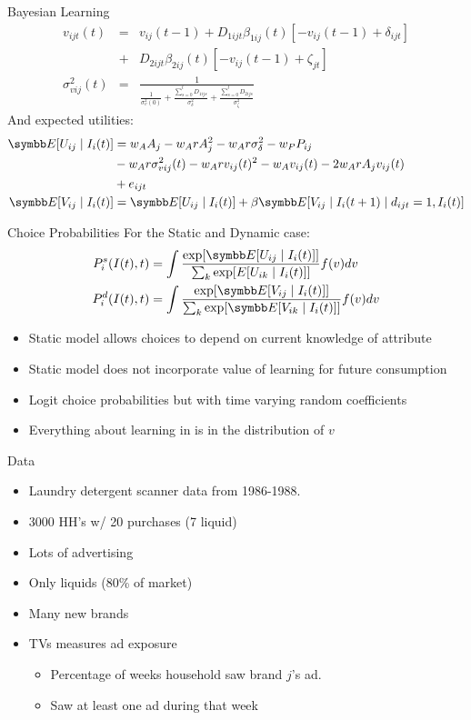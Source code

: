 \documentclass[aspectratio=169,11pt]{beamer}
\begin{document}
\begin{frame}{Bayesian Learning}
\begin{eqnarray*}
v_{ijt}(t) &=& v_{ij}(t-1) + D_{1ijt} \beta_{1ij}(t)[-v_{ij}(t-1) + \delta_{ijt}]  \\
&+& D_{2ijt} \beta_{2ij}(t)[-v_{ij}(t-1) + \zeta_{jt}]\\
\sigma_{vij}^2(t) &=& \frac{1}{\frac{1}{\sigma_v^2(0)} + \frac{\sum_{s=0}^t D_{1ijs}}{\sigma_{\delta}^2} + \frac{\sum_{s=0}^t D_{2ijs}}{\sigma_{\zeta}^2}}
\end{eqnarray*}
And expected utilities:
\begin{align*}
\E[U_{ij} \mid I_i(t)] &= w_A A_j - w_A r A_j^2 -w_A r \sigma_{\delta}^2 -w_P P_{ij} \\
& -w_A r \sigma_{vij}^2(t) - w_A r v_{ij}(t)^2  - w_A v_{ij}(t) - 2w_A r A_j v_{ij} (t) \\ &+ e_{ijt}\\
\E[V_{ij} \mid I_i(t)] &= \E[U_{ij} \mid I_i(t)] + \beta \E[V_{ij} \mid I_i(t+1) \mid d_{ijt} =1, I_i(t)]
\end{align*}
\end{frame}


\begin{frame}{Choice Probabilities}
For the Static and Dynamic case:
\begin{align*}
P^s_i(I(t),t) &= \int \frac{\exp [\E [U_{ij} \mid I_i(t)] ] } {\sum_k \exp [E [U_{ik} \mid I_i(t)] ] } f(v) dv\\
P^d_i(I(t),t) &= \int \frac{\exp [\E [V_{ij} \mid I_i(t)] ] } {\sum_k \exp [\E [V_{ik} \mid I_i(t)] ] } f(v) dv
\end{align*}
\begin{itemize}
\item Static model allows choices to depend on 
\alert{current knowledge of attribute}
\item Static model does not incorporate \alert{value of learning for future consumption}
\item Logit choice probabilities but with time varying random coefficients
\item Everything about learning in is in the distribution of $v$
\end{itemize}
\end{frame}


\begin{frame}{Data}
\begin{itemize}
\item Laundry detergent scanner data from 1986-1988.
\item 3000 HH's w/ 20 purchases (7 liquid)
\item Lots of advertising
\item Only liquids (80\% of market)
\item Many new brands
\item  TVs measures ad exposure
\begin{itemize}
\item Percentage of weeks household saw brand $j$'s ad.
\item Saw at least one ad during that week
\end{itemize}
\end{itemize}
\end{frame}
\end{document}
